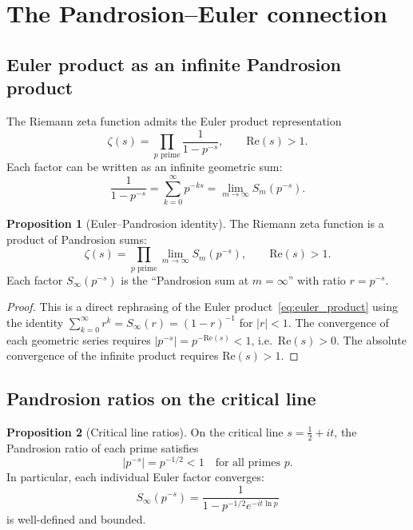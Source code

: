 \documentclass[11pt,a4paper]{article}
\theoremstyle{definition}
\newtheorem{proposition}{Proposition}[section]
\begin{document}
\section{The Pandrosion--Euler connection}
\label{sec:euler}

\subsection{Euler product as an infinite Pandrosion product}

The Riemann zeta function admits the Euler product representation
\begin{equation}
  \label{eq:euler_product}
  \zeta(s) = \prod_{p \text{ prime}} \frac{1}{1 - p^{-s}},
  \qquad \mathrm{Re}(s) > 1.
\end{equation}
Each factor can be written as an infinite geometric sum:
\[
  \frac{1}{1 - p^{-s}} = \sum_{k=0}^{\infty} p^{-ks} = \lim_{m \to \infty} S_m(p^{-s}).
\]

\begin{proposition}[Euler--Pandrosion identity]
\label{prop:euler_pandrosion}
The Riemann zeta function is a product of Pandrosion sums:
\begin{equation}
  \label{eq:euler_pandrosion}
  \zeta(s) = \prod_{p \text{ prime}} \lim_{m \to \infty} S_m(p^{-s}),
  \qquad \mathrm{Re}(s) > 1.
\end{equation}
Each factor $S_\infty(p^{-s})$ is the ``Pandrosion sum at $m = \infty$'' with ratio $r = p^{-s}$.
\end{proposition}

\begin{proof}
This is a direct rephrasing of the Euler product~\eqref{eq:euler_product} using the identity $\sum_{k=0}^{\infty} r^k = S_\infty(r) = (1-r)^{-1}$ for $|r| < 1$.  The convergence of each geometric series requires $|p^{-s}| = p^{-\mathrm{Re}(s)} < 1$, i.e.\ $\mathrm{Re}(s) > 0$.  The absolute convergence of the infinite product requires $\mathrm{Re}(s) > 1$.
\end{proof}

\subsection{Pandrosion ratios on the critical line}

\begin{proposition}[Critical line ratios]
\label{prop:critical_line}
On the critical line $s = \tfrac{1}{2} + it$, the Pandrosion ratio of each prime satisfies
\begin{equation}
  \label{eq:critical_ratio}
  |p^{-s}| = p^{-1/2} < 1 \quad \text{for all primes } p.
\end{equation}
In particular, each individual Euler factor converges:
\[
  S_\infty(p^{-s}) = \frac{1}{1 - p^{-1/2} e^{-it \ln p}}
\]
is well-defined and bounded.
\end{proposition}
\end{document}
